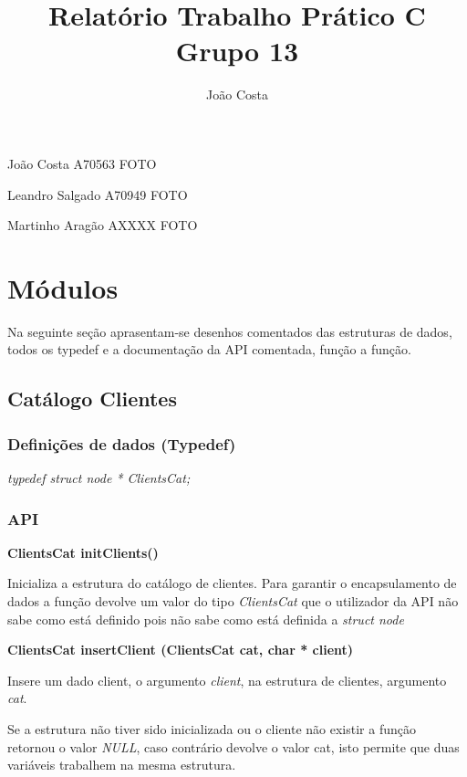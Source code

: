 \documentclass[12pt] {article}
\begin{document}
\title{Relatório Trabalho Prático C \\ Grupo 13}
\author{João Costa}

\maketitle

\begin{flushleft}
João Costa A70563 \newline
FOTO
\end{flushleft}

\begin{flushleft} 
Leandro Salgado A70949 \newline
FOTO
\end{flushleft}

\begin{flushleft} 
Martinho Aragão AXXXX \newline
FOTO
\end{flushleft}

\newpage

\tableofcontents

\newpage

\section{Módulos}
Na seguinte seção aprasentam-se desenhos comentados das estruturas de dados, 
todos os typedef e a documentação da API comentada, função a função.

\subsection{Catálogo Clientes}
\subsubsection{Definições de dados (Typedef)}
\emph{typedef struct node * ClientsCat;}
\subsubsection{API}
\noindent\textbf{ClientsCat initClients()} 
\par
Inicializa a estrutura do catálogo de clientes.  Para garantir o encapsulamento de dados a função devolve um valor do tipo \emph{ClientsCat} que o utilizador da API 
não sabe como está definido pois não sabe como está definida a \emph{struct node} \newline

\noindent\textbf{ClientsCat insertClient (ClientsCat cat, char * client)}
\par Insere um dado client, o argumento \emph{client}, na estrutura de clientes, argumento \emph{cat}.
\par Se a estrutura não tiver sido inicializada ou o cliente não existir a função retornou o valor \emph{NULL},
caso contrário devolve o valor cat, isto permite que duas variáveis trabalhem na mesma estrutura.
\end{document}
